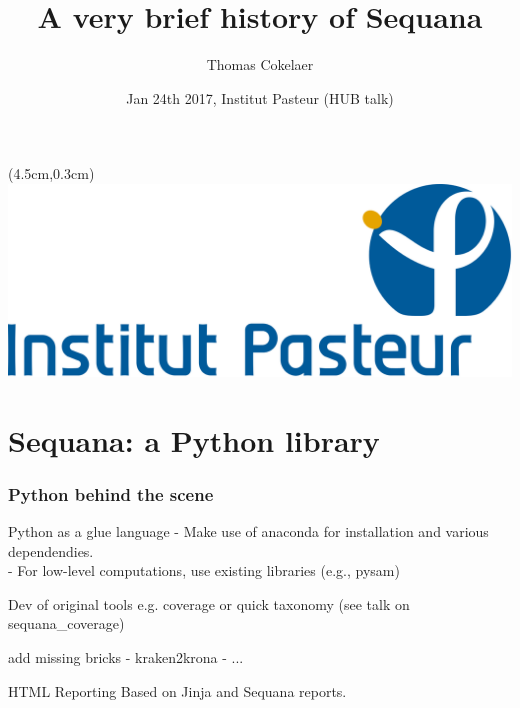 \documentclass{beamer}
\title[Sequana]{A very brief history of Sequana}
\author[T. Cokelaer]{Thomas Cokelaer}
\institute{Institut Pasteur}
\date{Jan 24th 2017, Institut Pasteur (HUB talk)}
\begin{document}

\begin{frame}[plain]
    \titlepage
    \begin{textblock*}{5cm}(4.5cm,0.3cm)
        \includegraphics[scale=0.09]{images/Institut_Pasteur.png}
    \end{textblock*}
\end{frame}



%
%





\section{Sequana: a Python library}

\begin{frame}
\frametitle{Python behind the scene}
 \begin{block}{Python as a glue language}
     - Make use of anaconda for installation and various dependendies. \\
     - For low-level computations, use existing libraries (e.g., pysam)
 \end{block}
 
 \begin{block}{Dev of original tools}
  e.g. coverage or quick taxonomy (see talk on sequana\_coverage)
 \end{block}
 
 \begin{block}{add missing bricks}
  - kraken2krona
  - ...
 \end{block}

 \begin{block}{HTML Reporting}
  Based on Jinja and Sequana reports.
 \end{block}
\end{frame}
\end{document}
